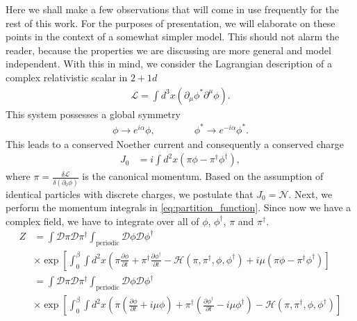Here we shall make a few observations that will come in use frequently for the rest of this work. For the purposes of presentation, we will elaborate on these points in the context of a somewhat simpler model. This should not alarm the reader, because the properties we are discussing are more general and model independent. With this in mind, we consider the Lagrangian description of a complex relativistic scalar in $2+1d$
        \begin{align}
            \mathcal{L} = \int d^3x \left(\partial_{\mu}\phi^{*} \partial^{\mu} \phi \right).
        \end{align}
        This system possesses a global symmetry
        \begin{align}
            \phi \rightarrow e^{i \alpha} \phi, \qquad\qquad \phi^* \rightarrow e^{-i \alpha} \phi^*.
        \end{align}
        This leads to a conserved Noether current and consequently a conserved charge
        \begin{align}
            J_{0} &= i \int d^2x \left( \pi \phi - \pi^{\dag}\phi^{\dag}\right),
        \end{align}
        where $\pi = \frac{\delta \mathcal{L}}{\delta ( \partial_0 \phi)}$ is the canonical momentum. Based on the assumption of identical particles with discrete charges, we postulate that $J_0 = \mathcal{N}$. Next, we perform the momentum integrals in \eqref{eq:partition_function}. Since now we have a complex field, we have to integrate over all of $\phi$, $\phi^{\dag}$, $\pi$ and $\pi^{\dag}$.
        \begin{align}
            Z &= \int \mathcal{D} \pi \mathcal{D} \pi^{\dag} \int_{\text{periodic}} \mathcal{D} \phi \mathcal{D} \phi^{\dag} \nonumber \\
            &\times \exp \left[ \int_0^{\beta} \int d^2x \left(\pi \frac{\partial \phi}{\partial t} +\pi^{\dag} \frac{\partial \phi^{\dag}}{\partial t} - \mathcal{H}(\pi, \pi^{\dag}, \phi, \phi^{\dag}) + i  \mu \left(\pi \phi - \pi^{\dag}\phi^{\dag} \right) \right] \label{eq:partition_function_complex_scalar} \nonumber \\
            &= \int \mathcal{D} \pi \mathcal{D} \pi^{\dag} \int_{\text{periodic}} \mathcal{D} \phi \mathcal{D} \phi^{\dag} \nonumber \\
            &\times \exp \left[ \int_0^{\beta} \int d^2x \left(\pi \left( \frac{\partial \phi}{\partial t} +i \mu \phi \right) +\pi^{\dag} \left( \frac{\partial \phi^{\dag}}{\partial t} -i \mu \phi^{\dag} \right) - \mathcal{H}(\pi, \pi^{\dag}, \phi, \phi^{\dag})  \right] \label{eq:partition_function_complex_scalar}
        \end{align}
